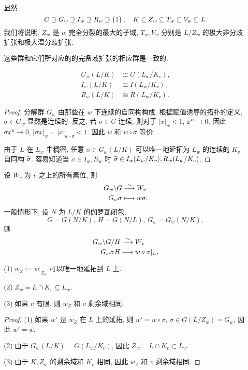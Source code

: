 显然 
  \[G\supseteq G_w\supseteq I_w\supseteq R_w\supseteq \left\{1\right\},\quad K\subseteq Z_w\subseteq T_w\subseteq V_w\subseteq L.\]
我们将说明, $Z_w$ 是 $w$ 完全分裂的最大的子域, $T_w,V_w$ 分别是 $L/Z_w$ 的极大非分歧扩张和极大温分歧扩张.

这些群和它们所对应的的完备域扩张的相应群是一致的.
\begin{proposition}{}{}
  \[\begin{split}
    G_w(L/K)&\cong G(L_w/K_v),\\
    I_w(L/K)&\cong I(L_w/K_v),\\
    R_w(L/K)&\cong R(L_w/K_v).
  \end{split}\]
\end{proposition}
\begin{proof}
分解群 $G_w$ 由那些在 $w$ 下连续的自同构构成. 根据赋值诱导的拓扑的定义, $\sigma\in G_w$ 显然是连续的. 反之, 若 $\sigma\in G$ 连续, 则对于 $|x|_w<1$, $x^n\rightarrow 0$, 因此 $\sigma x^n\to 0$, $|\sigma x|_w=|x|_{w\circ \sigma}<1$. 因此 $w$ 和 $w\circ \sigma$ 等价.

由于 $L$ 在 $L_w$ 中稠密, 任意 $\sigma\in G_w(L/K)$ 可以唯一地延拓为 $L_w$ 的连续的 $K_v$ 自同构 $\widetilde \sigma$. 容易知道当 $\sigma\in I_w,R_w$ 时 $\widetilde \sigma\in I_w(L_w/K_v), R_w(L_w/K_v)$.
\end{proof}

 设 $W_v$ 为 $v$ 之上的所有素位, 则
  \[\begin{split}
G_w\backslash G&\stackrel{\sim}{\longrightarrow} W_v\\
G_w\sigma&\longmapsto w\sigma.
\end{split}\]
一般情形下, 设 $N$ 为 $L/K$ 的伽罗瓦闭包, 
  \[G=G(N/K),\ H=G(N/L),\ G_w=G_w(N/K),\]
则
  \[\begin{split}
G_w\backslash G/H&\stackrel{\sim}{\longrightarrow} W_v\\
G_w\sigma H&\longmapsto w\circ \sigma|_L.
\end{split}\]

\begin{proposition}{}{}
(1) $w_Z:=w|_{Z_w}$ 可以唯一地延拓到 $L$ 上.

(2) $Z_w=L\cap K_v\subseteq L_w$.

(3) 如果 $v$ 有限, 则 $w_Z$ 和 $v$ 剩余域相同.
\end{proposition}
\begin{proof}
(1) 如果 $w'$ 是 $w_Z$ 在 $L$ 上的延拓, 则 $w'=w\circ\sigma$, $\sigma\in G(L/Z_w)=G_w$, 因此 $w'=w$.

(2) 由于 $G_w(L/K)=G(L_w/K_v)$, 因此 $Z_w=L\cap K_v\subset L_w$.

(3) 由于 $K,Z_w$ 的剩余域和 $K_v$ 相同, 因此 $w_Z$ 和 $v$ 剩余域相同.
\end{proof}

